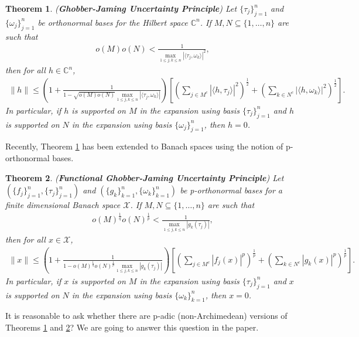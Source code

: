 \documentclass{amsart}
\newtheorem{theorem}{Theorem}[section]
\begin{document}
\begin{theorem}\cite{GHOBBERJAMING}\label{GJ} (\textbf{Ghobber-Jaming  Uncertainty Principle})
Let 	$\{\tau_j\}_{j=1}^n$ and $\{\omega_j\}_{j=1}^n$ be orthonormal bases for   the Hilbert space $\mathbb{C}^n$.  If $M,N\subseteq \{1, \dots, n\}$ are such that 
\begin{align*}
o(M)o(N)< \frac{1}{\displaystyle \max_{1\leq j, k\leq n}|\langle\tau_j, \omega_k\rangle |^2},
\end{align*}
then for all $h \in \mathbb{C}^n$, 
\begin{align*}
	\|h\|\leq \left(1+\frac{1}{1-\sqrt{o(M)o(N)}\displaystyle\max_{1\leq j,k\leq n}|\langle\tau_j, \omega_k\rangle |}\right)\left[\left(\sum_{j\in M^c}|\langle h, \tau_j\rangle |^2\right)^\frac{1}{2}+\left(\sum_{k\in N^c}|\langle h, \omega_k\rangle |^2\right)^\frac{1}{2}\right].
\end{align*}
In particular, if $h$ is supported on $M$ in the expansion using basis $\{\tau_j\}_{j=1}^n$ and $h$ is supported on $N$ in the expansion using basis $\{\omega_j\}_{j=1}^n$, then $h=0$. 
\end{theorem}
Recently, Theorem \ref{GJ} has been extended to Banach spaces using the notion of p-orthonormal bases.
\begin{theorem} \label{K} \cite{KRISHNA} (\textbf{Functional Ghobber-Jaming  Uncertainty Principle})
	Let $(\{f_j\}_{j=1}^n, \{\tau_j\}_{j=1}^n)$	and $(\{g_k\}_{k=1}^n, \{\omega_k\}_{k=1}^n)$ be p-orthonormal bases  for a finite dimensional Banach space $\mathcal{X}$.  If $M,N\subseteq \{1, \dots, n\}$ are such that 
	\begin{align*}
		o(M)^\frac{1}{q}o(N)^\frac{1}{p}< \frac{1}{\displaystyle \max_{1\leq j,k\leq n}|g_k(\tau_j) |},
	\end{align*}
	then for all $x \in \mathcal{X}$, 	
	\begin{align*}
		\|x\|\leq \left(1+\frac{1}{1-o(M)^\frac{1}{q}o(N)^\frac{1}{p}\displaystyle\max_{1\leq j,k\leq n}|g_k(\tau_j)|}\right)\left[\left(\sum_{j\in M^c}|f_j(x)|^p\right)^\frac{1}{p}+\left(\sum_{k\in N^c}|g_k(x) |^p\right)^\frac{1}{p}\right].
	\end{align*}
	In particular, if $x$ is supported on $M$ in the expansion using basis $\{\tau_j\}_{j=1}^n$ and $x$ is supported on $N$ in the expansion using basis $\{\omega_k\}_{k=1}^n$, then $x=0$. 
\end{theorem}
 It is  reasonable to ask whether there  are p-adic (non-Archimedean) versions of Theorems \ref{GJ} and \ref{K}? We are going to answer this question in the paper. 
\end{document}
